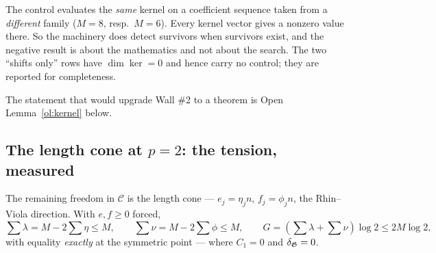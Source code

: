 \begin{remark}\label{rem:control}
The control evaluates the \emph{same} kernel on a coefficient sequence taken from a
\emph{different} family ($M=8$, resp.\ $M=6$). Every kernel vector gives a nonzero value
there. So the machinery does detect survivors when survivors exist, and the negative result
is about the mathematics and not about the search. The two ``shifts only'' rows have
$\dim\ker=0$ and hence carry no control; they are reported for completeness.
\end{remark}

\begin{center}\end{center}

The statement that would upgrade Wall \#2 to a theorem is Open Lemma~\ref{ol:kernel} below.

\subsection{The length cone at \texorpdfstring{$p=2$}{p=2}: the tension, measured}\label{ss:cone}

The remaining freedom in $\mathcal C$ is the length cone --- $e_j=\eta_jn$, $f_j=\phi_jn$,
the Rhin--Viola direction. With $e,f\ge0$ forced,
\[
 \textstyle\sum\lambda=M-2\sum\eta\le M,\qquad \sum\nu=M-2\sum\phi\le M,
 \qquad G=(\sum\lambda+\sum\nu)\log2\le2M\log2,
\]
with equality \emph{exactly} at the symmetric point --- where $C_1=0$ and $\delta_{\mathfrak{G}}=0$.

